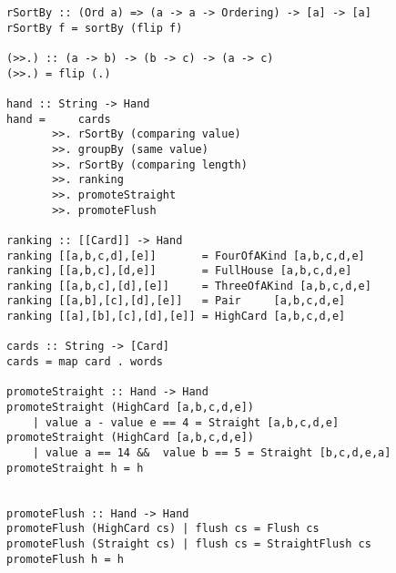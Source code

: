 \lhN
\hspace*{\fill} 
\lhA
\begin{lstlisting}[frame=single]
rSortBy :: (Ord a) => (a -> a -> Ordering) -> [a] -> [a]
rSortBy f = sortBy (flip f)

(>>.) :: (a -> b) -> (b -> c) -> (a -> c)
(>>.) = flip (.)

hand :: String -> Hand
hand =     cards
       >>. rSortBy (comparing value)
       >>. groupBy (same value)
       >>. rSortBy (comparing length)
       >>. ranking 
       >>. promoteStraight
       >>. promoteFlush    

ranking :: [[Card]] -> Hand
ranking [[a,b,c,d],[e]]       = FourOfAKind [a,b,c,d,e]
ranking [[a,b,c],[d,e]]       = FullHouse [a,b,c,d,e]
ranking [[a,b,c],[d],[e]]     = ThreeOfAKind [a,b,c,d,e]
ranking [[a,b],[c],[d],[e]]   = Pair     [a,b,c,d,e]
ranking [[a],[b],[c],[d],[e]] = HighCard [a,b,c,d,e] 

cards :: String -> [Card]
cards = map card . words 

promoteStraight :: Hand -> Hand
promoteStraight (HighCard [a,b,c,d,e]) 
    | value a - value e == 4 = Straight [a,b,c,d,e]
promoteStraight (HighCard [a,b,c,d,e]) 
    | value a == 14 &&  value b == 5 = Straight [b,c,d,e,a]
promoteStraight h = h


promoteFlush :: Hand -> Hand
promoteFlush (HighCard cs) | flush cs = Flush cs
promoteFlush (Straight cs) | flush cs = StraightFlush cs
promoteFlush h = h
\end{lstlisting}
\lhend

